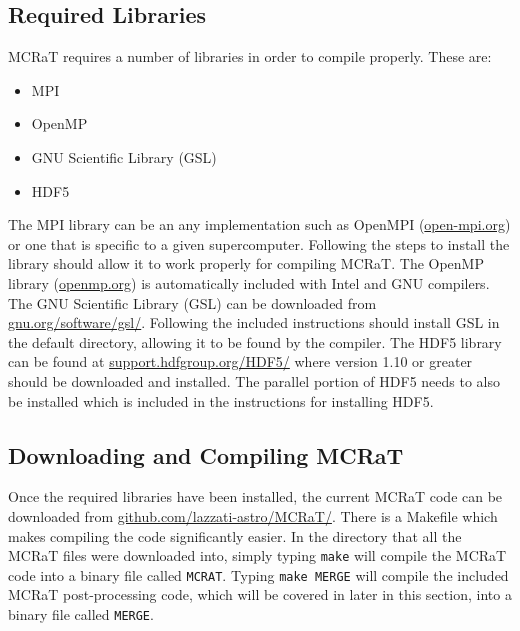 \documentclass[12pt,a4paper]{article}
\begin{document}
\subsection{Required Libraries}
MCRaT requires a number of libraries in order to compile properly. These are:
\begin{itemize}
\item MPI
\item OpenMP
\item GNU Scientific Library (GSL)
\item HDF5
\end{itemize}

The MPI library can be an any implementation such as OpenMPI (\href{http://www.open-mpi.org/}{open-mpi.org}) or one that is specific to a given supercomputer. Following the steps to install the library should allow it to work properly for compiling MCRaT. The OpenMP library (\href{http://www.openmp.org/}{openmp.org}) is automatically included with Intel and GNU compilers. The GNU Scientific Library (GSL) can be downloaded from \href{https://www.gnu.org/software/gsl/}{gnu.org/software/gsl/}. Following the included instructions should install GSL in the default directory, allowing it to be found by the compiler. The HDF5 library can be found at \href{https://support.hdfgroup.org/HDF5/}{support.hdfgroup.org/HDF5/} where version 1.10 or greater should be downloaded and installed. The parallel portion of HDF5 needs to also be installed which is included in the instructions for installing HDF5.

\subsection{Downloading and Compiling MCRaT}
Once the required libraries have been installed, the current MCRaT code can be downloaded from \href{https://github.com/lazzati-astro/MCRaT/tree/master/HYBRID_PARALLEL_KN}{github.com/lazzati-astro/MCRaT/}. There is a Makefile which  makes compiling the code significantly easier. In the directory that all the MCRaT files were downloaded into, simply typing \texttt{make} will compile the MCRaT code into a binary file called \texttt{MCRAT}. Typing \texttt{make MERGE} will compile the included MCRaT post-processing code, which will be covered in later in this section, into a binary file called \texttt{MERGE}.
\end{document}
